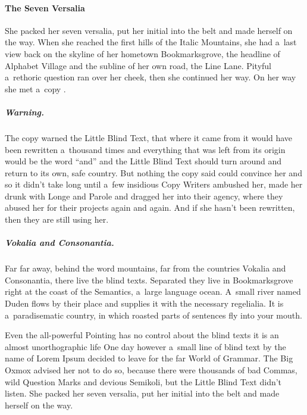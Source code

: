 \paragraph{The Seven Versalia}
She packed her seven versalia, put her initial into the belt and made herself on the way. When she reached the first hills of the Italic Mountains, she had a~last view back on the skyline of her hometown Bookmarksgrove, the headline of Alphabet Village and the subline of her own road, the Line Lane. Pityful a~rethoric question ran over her cheek, then she continued her way. On her way she met a~copy \citep{shore}.

\subparagraph{Warning.} The copy warned the Little Blind Text, that where it came from it would have been rewritten a~thousand times and everything that was left from its origin would be the word ``and'' and the Little Blind Text should turn around and return to its own, safe country. But nothing the copy said could convince her and so it didn't take long until a~few insidious Copy Writers ambushed her, made her drunk with Longe and Parole and dragged her into their agency, where they abused her for their projects again and again. And if she hasn't been rewritten, then they are still using her.

\subparagraph{Vokalia and Consonantia.} Far far away, behind the word mountains, far from the countries Vokalia and Consonantia, there live the blind texts. Separated they live in Bookmarksgrove right at the coast of the Semantics, a~large language ocean. A~small river named Duden flows by their place and supplies it with the necessary regelialia. It is a~paradisematic country, in which roasted parts of sentences fly into your mouth.

Even the all-powerful Pointing has no control about the blind texts it is an almost unorthographic life One day however a~small line of blind text by the name of Lorem Ipsum decided to leave for the far World of Grammar. The Big Oxmox advised her not to do so, because there were thousands of bad Commas, wild Question Marks and devious Semikoli, but the Little Blind Text didn't listen. She packed her seven versalia, put her initial into the belt and made herself on the way.

